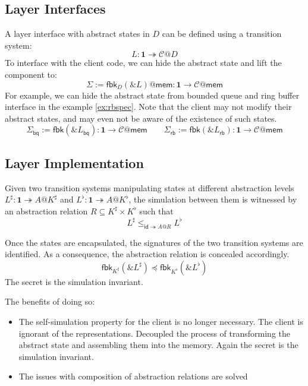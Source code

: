 \documentclass[acmsmall,screen,review,anonymous]{acmart}
\newcommand{\kw}[1]{\ensuremath{ \mathsf{#1} }}
\renewcommand{\preceq}{\preccurlyeq}
\begin{document}
\subsection{Layer Interfaces} %

A layer interface with abstract states in $D$
can be defined using a transition system:
\[
  L : \mathbf{1} \twoheadrightarrow \mathcal{C}@D
\]
To interface with the client code,
we can hide the abstract state and lift the component to:
\[
  \Sigma := \kw{fbk}_D(\&L)@\kw{mem} : \mathbf{1} \rightarrow \mathcal{C}@\kw{mem}
\]
For example, we can hide the abstract state
from bounded queue and ring buffer interface in the example \ref{ex:rbspec}.
Note that the client may not modify their abstract states,
and may even not be aware of the existence of such states.
\[
  \Sigma_\kw{bq} := \kw{fbk}(\&L_\kw{bq}): \mathbf{1} \rightarrow \mathcal{C}@\kw{mem} \qquad
  \Sigma_\kw{rb} := \kw{fbk}(\&L_\kw{rb}): \mathbf{1} \rightarrow \mathcal{C}@\kw{mem}
\]


\subsection{Layer Implementation}
\label{sec:cal:impl}

Given two transition systems manipulating states
at different abstraction levels
$L^\sharp: \mathbf{1} \twoheadrightarrow A@K^\sharp$
and
$L^\flat: \mathbf{1} \twoheadrightarrow A@K^\flat$,
the simulation between them is witnessed
by an abstraction relation $R \subseteq K^\sharp \times K^\flat$
such that
\[
  L^\sharp \le_{\kw{id} \twoheadrightarrow A@R} L^\flat
\]

Once the states are encapsulated,
the signatures of the two transition systems are identified.
As a consequence, the abstraction relation is concealed accordingly.
\[
  \kw{fbk}_{K^\sharp}(\& L^\sharp) \preceq \kw{fbk}_{K^\flat}(\& L^\flat)
\]
The secret is the simulation invariant.

The benefits of doing so:
\begin{itemize}
\item The self-simulation property for the client is no longer necessary.
  The client is ignorant of the representations.
  Decoupled the process of transforming the abstract state
  and assembling them into the memory.
  Again the secret is the simulation invariant.
\item The issues with composition of abstraction relations are solved
\end{itemize}
\end{document}
